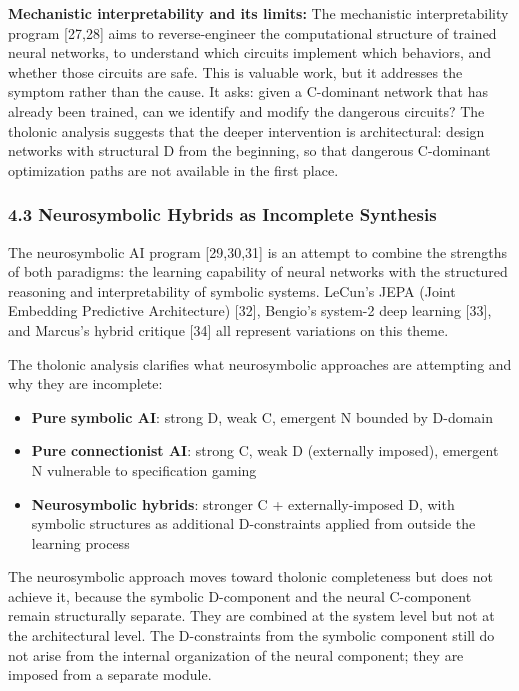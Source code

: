 \documentclass[
  11pt,
  letterpaper,
]{article}
\providecommand{\tightlist}{%
  \setlength{\itemsep}{0pt}\setlength{\parskip}{0pt}}
\begin{document}
\textbf{Mechanistic interpretability and its limits:} The mechanistic
interpretability program {[}27,28{]} aims to reverse-engineer the
computational structure of trained neural networks, to understand which
circuits implement which behaviors, and whether those circuits are safe.
This is valuable work, but it addresses the symptom rather than the
cause. It asks: given a C-dominant network that has already been
trained, can we identify and modify the dangerous circuits? The tholonic
analysis suggests that the deeper intervention is architectural: design
networks with structural D from the beginning, so that dangerous
C-dominant optimization paths are not available in the first place.

\subsubsection{4.3 Neurosymbolic Hybrids as Incomplete
Synthesis}\label{neurosymbolic-hybrids-as-incomplete-synthesis}

The neurosymbolic AI program {[}29,30,31{]} is an attempt to combine the
strengths of both paradigms: the learning capability of neural networks
with the structured reasoning and interpretability of symbolic systems.
LeCun's JEPA (Joint Embedding Predictive Architecture) {[}32{]},
Bengio's system-2 deep learning {[}33{]}, and Marcus's hybrid critique
{[}34{]} all represent variations on this theme.

The tholonic analysis clarifies what neurosymbolic approaches are
attempting and why they are incomplete:

\begin{itemize}
\tightlist
\item
  \textbf{Pure symbolic AI}: strong D, weak C, emergent N bounded by
  D-domain
\item
  \textbf{Pure connectionist AI}: strong C, weak D (externally imposed),
  emergent N vulnerable to specification gaming
\item
  \textbf{Neurosymbolic hybrids}: stronger C + externally-imposed D,
  with symbolic structures as additional D-constraints applied from
  outside the learning process
\end{itemize}

The neurosymbolic approach moves toward tholonic completeness but does
not achieve it, because the symbolic D-component and the neural
C-component remain structurally separate. They are combined at the
system level but not at the architectural level. The D-constraints from
the symbolic component still do not arise from the internal organization
of the neural component; they are imposed from a separate module.
\end{document}
